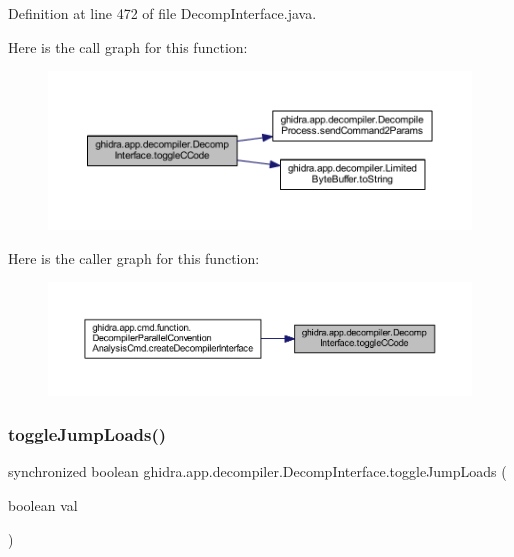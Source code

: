 Definition at line 472 of file Decomp\+Interface.\+java.

Here is the call graph for this function\+:
\nopagebreak
\begin{figure}[H]
\begin{center}
\leavevmode
\includegraphics[width=350pt]{classghidra_1_1app_1_1decompiler_1_1_decomp_interface_ad43588ca711cada0fbc8421ebff714f5_cgraph}
\end{center}
\end{figure}
Here is the caller graph for this function\+:
\nopagebreak
\begin{figure}[H]
\begin{center}
\leavevmode
\includegraphics[width=350pt]{classghidra_1_1app_1_1decompiler_1_1_decomp_interface_ad43588ca711cada0fbc8421ebff714f5_icgraph}
\end{center}
\end{figure}
\mbox{\label{classghidra_1_1app_1_1decompiler_1_1_decomp_interface_ae85bc75b791bef3138569cad3de61164}} 
\subsubsection{\texorpdfstring{toggleJumpLoads()}{toggleJumpLoads()}}
{\footnotesize\ttfamily synchronized boolean ghidra.\+app.\+decompiler.\+Decomp\+Interface.\+toggle\+Jump\+Loads (\begin{DoxyParamCaption}\item[{boolean}]{val }\end{DoxyParamCaption})\hspace{0.3cm}{\ttfamily [inline]}}

